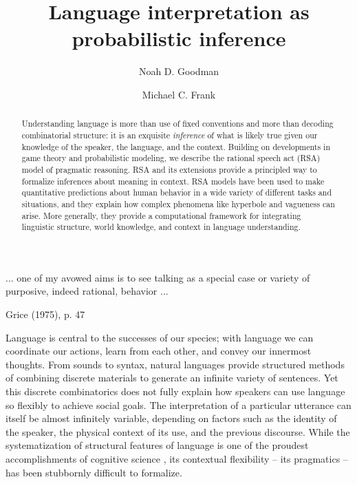 \documentclass[]{elsarticle}
\title{Language interpretation as probabilistic inference}
\author[stan]{Noah D. Goodman\corref{cor1}}
\author[stan]{Michael C. Frank}
\begin{document}
\begin{abstract}
Understanding language is more than use of fixed conventions and more than decoding combinatorial structure: it is an exquisite \emph{inference} of what is likely true given our knowledge of the speaker, the language, and the context.
Building on developments in game theory and probabilistic modeling, we describe the rational speech act (RSA) model of pragmatic reasoning. RSA and its extensions provide a principled way to formalize inferences about meaning in context. RSA models have been used to make quantitative predictions about human behavior in a wide variety of different tasks and situations, and they explain how complex phenomena like hyperbole and vagueness can arise. More generally, they provide a computational framework for integrating linguistic structure, world knowledge, and context in language understanding.
\end{abstract}

\maketitle

\epigraph{... one of my avowed aims is to see talking as a special case or
variety of purposive, indeed rational, behavior ...}{Grice (1975),
p. 47}

\label{introduction}

Language is central to the successes of our species; with language we
can coordinate our actions, learn from each other, and convey our
innermost thoughts. From sounds to syntax, natural languages provide
structured methods of combining discrete materials to generate an
infinite variety of sentences. Yet this discrete combinatorics does not
fully explain how speakers can use language so flexibly to achieve
social goals. The interpretation of a particular utterance
can itself be almost infinitely variable, depending on factors such as
the identity of the speaker, the physical context of its use, and the
previous discourse. While the systematization of structural features of
language is one of the proudest accomplishments of cognitive science \citep[e.g.,][]{chomsky1965,jackendoff2002,goldberg2003}, its contextual
flexibility -- its pragmatics -- has been stubbornly difficult to
formalize.
\end{document}
